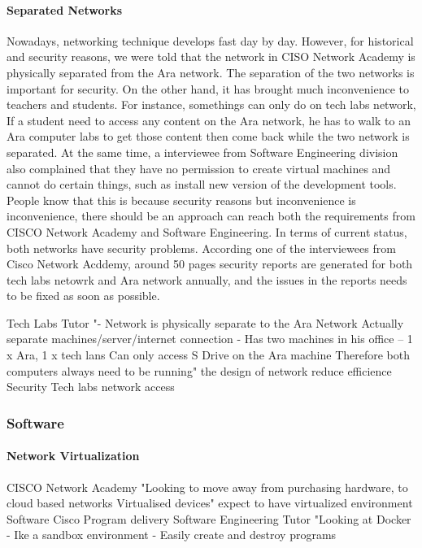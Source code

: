 \paragraph{Separated Networks}
Nowadays, networking technique develops fast day by day. However, for historical and security reasons, we were told that the network in CISO Network Academy is physically separated from the Ara network. The separation of the two networks is important for security. On the other hand, it has brought much inconvenience to teachers and students. For instance, somethings can only do on tech labs network, If a student need to access any content on the Ara network, he has to walk to an Ara computer labs to get those content then come back while the two network is separated. At the same time, a interviewee from Software Engineering division also complained that they have no permission to create virtual machines and cannot do certain things, such as install new version of the development tools. People know that this is because security reasons but inconvenience is inconvenience, there should be an approach can reach both the requirements from CISCO Network Academy and Software Engineering. In terms of current status, both networks have security problems. According one of the interviewees from Cisco Network Acddemy, around 50 pages security reports are generated for both tech labs netowrk and Ara network annually, and the issues in the reports needs to be fixed as soon as possible.

Tech Labs Tutor	"- Network is physically separate to the Ara Network
    Actually separate machines/server/internet connection
- Has two machines in his office – 1 x Ara, 1 x tech lans
    Can only access S Drive on the Ara machine
    Therefore both computers always need to be running"	the design of network reduce efficience	Security	Tech labs network access


\subsubsection{Software} 

\paragraph{Network Virtualization}


CISCO Network Academy	"Looking to move away from purchasing hardware, to cloud based networks
  Virtualised devices"	expect to have virtualized environment	Software	Cisco Program delivery
Software Engineering Tutor	"Looking at Docker
- Ike a sandbox environment
- Easily create and destroy programs


